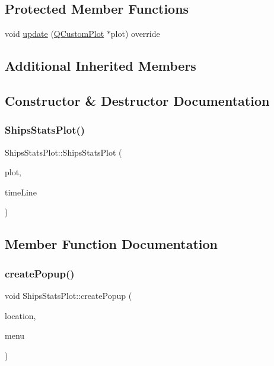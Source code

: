 \subsection*{Protected Member Functions}
\begin{DoxyCompactItemize}
\item 
void \mbox{\hyperlink{class_ships_stats_plot_a1e9a41757c9d114a939318d7582c060c}{update}} (\mbox{\hyperlink{class_q_custom_plot}{Q\+Custom\+Plot}} $\ast$plot) override
\end{DoxyCompactItemize}
\subsection*{Additional Inherited Members}


\subsection{Constructor \& Destructor Documentation}
\mbox{\label{class_ships_stats_plot_a8d1f07e750913ab4b9b7ed9ad742e700}} 
\subsubsection{\texorpdfstring{ShipsStatsPlot()}{ShipsStatsPlot()}}
{\footnotesize\ttfamily Ships\+Stats\+Plot\+::\+Ships\+Stats\+Plot (\begin{DoxyParamCaption}\item[{\mbox{\hyperlink{class_q_custom_plot}{Q\+Custom\+Plot}} $\ast$}]{plot,  }\item[{\mbox{\hyperlink{class_q_c_p_item_line}{Q\+C\+P\+Item\+Line}} $\ast$}]{time\+Line }\end{DoxyParamCaption})}



\subsection{Member Function Documentation}
\mbox{\label{class_ships_stats_plot_a466616522ee3eb4623479fcd1f844a85}} 
\subsubsection{\texorpdfstring{createPopup()}{createPopup()}}
{\footnotesize\ttfamily void Ships\+Stats\+Plot\+::create\+Popup (\begin{DoxyParamCaption}\item[{\mbox{\hyperlink{class_graph_interaction_controller_a67e6eba082927bf2b984bed54fe32764}{Graph\+Interaction\+Controller\+::\+Popup\+Menu\+Location}}}]{location,  }\item[{Q\+Menu $\ast$}]{menu }\end{DoxyParamCaption})}

